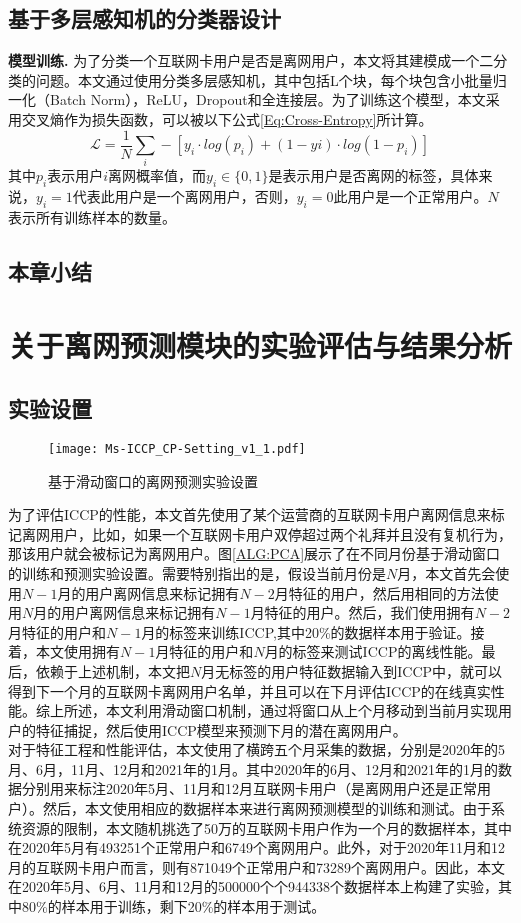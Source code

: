 \subsection{基于多层感知机的分类器设计}
\textbf{模型训练.} 为了分类一个互联网卡用户是否是离网用户，本文将其建模成一个二分类的问题。本文通过使用分类多层感知机，其中包括L个块，每个块包含小批量归一化（Batch Norm），ReLU，Dropout和全连接层。为了训练这个模型，本文采用交叉熵作为损失函数，可以被以下公式\eqref{Eq:Cross-Entropy}所计算。
\begin{equation}
	\mathcal{L} = \frac{1}{N} \sum_{i}^{} -[y_{i} \cdot log(p_{i}) + (1-y{i}) \cdot log(1-p_{i})]
	\label{Eq:Cross-Entropy}
\end{equation}
其中$p_{i}$表示用户$i$离网概率值，而$y_{i} \in \{ 0, 1\}$是表示用户是否离网的标签，具体来说，$y_{i} = 1$代表此用户是一个离网用户，否则，$y_{i} = 0$此用户是一个正常用户。$N$表示所有训练样本的数量。

\subsection{本章小结}
\newpage

\section{关于离网预测模块的实验评估与结果分析}
\subsection{实验设置}
\begin{figure}[hbt]
	\centering
	\texttt{[image: Ms-ICCP\_CP-Setting\_v1\_1.pdf]}
	\caption{基于滑动窗口的离网预测实验设置}
	\label{Fig:CP-Setting}
\end{figure}
为了评估ICCP的性能，本文首先使用了某个运营商的互联网卡用户离网信息来标记离网用户，比如，如果一个互联网卡用户双停超过两个礼拜并且没有复机行为，那该用户就会被标记为离网用户。图\ref{ALG:PCA}展示了在不同月份基于滑动窗口的训练和预测实验设置。需要特别指出的是，假设当前月份是$N$月，本文首先会使用$N-1月$的用户离网信息来标记拥有$N-2$月特征的用户，然后用相同的方法使用$N$月的用户离网信息来标记拥有$N-1$月特征的用户。然后，我们使用拥有$N-2$月特征的用户和$N-1$月的标签来训练ICCP,其中20\%的数据样本用于验证。接着，本文使用拥有$N-1$月特征的用户和$N$月的标签来测试ICCP的离线性能。最后，依赖于上述机制，本文把$N$月无标签的用户特征数据输入到ICCP中，就可以得到下一个月的互联网卡离网用户名单，并且可以在下月评估ICCP的在线真实性能。综上所述，本文利用滑动窗口机制，通过将窗口从上个月移动到当前月实现用户的特征捕捉，然后使用ICCP模型来预测下月的潜在离网用户。\\
对于特征工程和性能评估，本文使用了横跨五个月采集的数据，分别是2020年的5月、6月，11月、12月和2021年的1月。其中2020年的6月、12月和2021年的1月的数据分别用来标注2020年5月、11月和12月互联网卡用户（是离网用户还是正常用户）。然后，本文使用相应的数据样本来进行离网预测模型的训练和测试。由于系统资源的限制，本文随机挑选了50万的互联网卡用户作为一个月的数据样本，其中在2020年5月有493251个正常用户和6749个离网用户。此外，对于2020年11月和12月的互联网卡用户而言，则有871049个正常用户和73289个离网用户。因此，本文在2020年5月、6月、11月和12月的500000个个944338个数据样本上构建了实验，其中80\%的样本用于训练，剩下20\%的样本用于测试。
